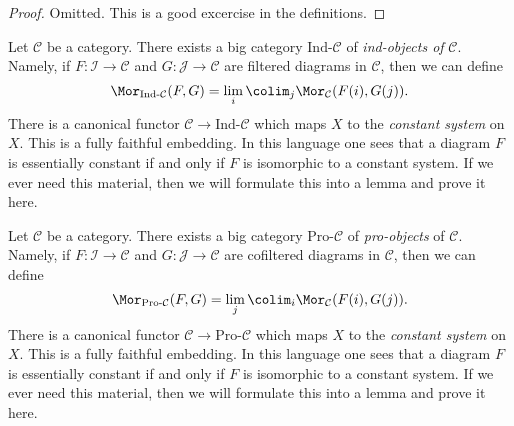 \begin{proof}
Omitted. This is a good excercise in the definitions.
\end{proof}

\begin{remark}
\label{remark-ind-category}
Let $\mathcal{C}$ be a category. There exists a big category
$\text{Ind-}\mathcal{C}$ of {\it ind-objects of} $\mathcal{C}$.
Namely, if $F : \mathcal{I} \to \mathcal{C}$ and
$G : \mathcal{J} \to \mathcal{C}$ are filtered diagrams in $\mathcal{C}$,
then we can define
$$
\Mor_{\text{Ind-}\mathcal{C}}(F, G) =
\lim_i \colim_j \Mor_\mathcal{C}(F(i), G(j)).
$$
There is a canonical functor $\mathcal{C} \to \text{Ind-}\mathcal{C}$
which maps $X$ to the {\it constant system} on $X$. This is a fully
faithful embedding. In this language one sees that a diagram $F$ is
essentially constant if and only if $F$ is isomorphic to a constant system.
If we ever need this material, then we will formulate this into a lemma
and prove it here.
\end{remark}

\begin{remark}
\label{remark-pro-category}
Let $\mathcal{C}$ be a category. There exists a big category
$\text{Pro-}\mathcal{C}$ of {\it pro-objects} of $\mathcal{C}$.
Namely, if $F : \mathcal{I} \to \mathcal{C}$ and
$G : \mathcal{J} \to \mathcal{C}$ are cofiltered diagrams in $\mathcal{C}$,
then we can define
$$
\Mor_{\text{Pro-}\mathcal{C}}(F, G) =
\lim_j \colim_i \Mor_\mathcal{C}(F(i), G(j)).
$$
There is a canonical functor $\mathcal{C} \to \text{Pro-}\mathcal{C}$
which maps $X$ to the {\it constant system} on $X$. This is a fully
faithful embedding. In this language one sees that a diagram $F$ is
essentially constant if and only if $F$ is isomorphic to a constant system.
If we ever need this material, then we will formulate this into a lemma
and prove it here.
\end{remark}

